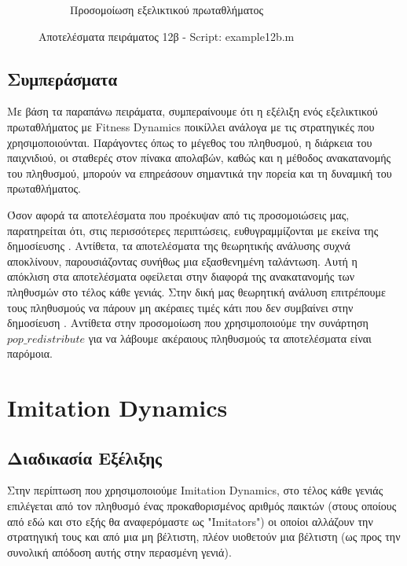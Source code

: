 \documentclass[12pt]{report}
\begin{document}
\begin{figure}[H]
\begin{subfigure}[b]{0.5\linewidth}
        \caption{Προσομοίωση εξελικτικού πρωταθλήματος}
        \label{fig:fig_fit_12b_c}
        
    \end{subfigure}

    \caption{Αποτελέσματα πειράματος 12β - \foreignlanguage{english}{Script: example12b.m}}
    \label{fig:fig_fit_12b}
\end{figure}
\newpage
\subsection{Συμπεράσματα}
Με βάση τα παραπάνω πειράματα, συμπεραίνουμε ότι η εξέλιξη ενός εξελικτικού πρωταθλήματος με \foreignlanguage{english}{Fitness Dynamics} ποικίλλει ανάλογα με τις στρατηγικές που χρησιμοποιούνται. Παράγοντες όπως το μέγεθος του πληθυσμού, η διάρκεια του παιχνιδιού, οι σταθερές στον πίνακα απολαβών, καθώς και η μέθοδος ανακατανομής του πληθυσμού, μπορούν να επηρεάσουν σημαντικά την πορεία και τη δυναμική του πρωταθλήματος.

Όσον αφορά τα αποτελέσματα που προέκυψαν από τις προσομοιώσεις μας, παρατηρείται ότι, στις περισσότερες περιπτώσεις, ευθυγραμμίζονται με εκείνα της δημοσίευσης \cite{mathieu1999}. Αντίθετα, τα αποτελέσματα της θεωρητικής ανάλυσης συχνά αποκλίνουν, παρουσιάζοντας συνήθως μια εξασθενημένη ταλάντωση. Αυτή η απόκλιση στα αποτελέσματα οφείλεται στην διαφορά της ανακατανομής των πληθυσμών στο τέλος κάθε γενιάς. Στην δική μας θεωρητική ανάλυση επιτρέπουμε τους πληθυσμούς να πάρουν μη ακέραιες τιμές κάτι που δεν συμβαίνει στην δημοσίευση \cite{mathieu1999}. Αντίθετα στην προσομοίωση που χρησιμοποιούμε την συνάρτηση $pop\_redistribute$ για να λάβουμε ακέραιους πληθυσμούς τα αποτελέσματα είναι παρόμοια.

\newpage
\section{\foreignlanguage{english}{Imitation Dynamics}}
\subsection{Διαδικασία Εξέλιξης}
Στην περίπτωση που χρησιμοποιούμε \foreignlanguage{english}{Imitation Dynamics}, στο τέλος κάθε γενιάς επιλέγεται από τον πληθυσμό ένας προκαθορισμένος αριθμός παικτών (στους οποίους από εδώ και στο εξής θα αναφερόμαστε ως \foreignlanguage{english}{"Imitators"}) οι οποίοι αλλάζουν την στρατηγική τους και από μια μη βέλτιστη, πλέον υιοθετούν μια βέλτιστη (ως προς την συνολική απόδοση αυτής στην περασμένη γενιά).
\end{document}
